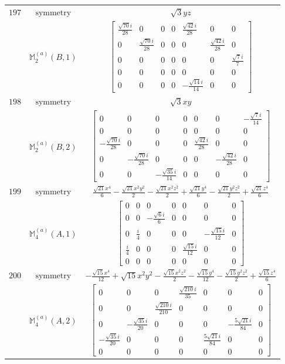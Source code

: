 \documentclass[fleqn,8pt,landscape]{jsarticle}
\begin{document}
\begin{longtable}{ccc}
$ 197 $ & $ \text{symmetry} $ & $ \sqrt{3} y z $ \\
$  $ & $ \mathbb{M}_{2}^{(a)}(B,1) $ & $ \begin{bmatrix} \frac{\sqrt{70} i}{28} & 0 & 0 & 0 & \frac{\sqrt{42} i}{28} & 0 & 0 \\ 0 & \frac{\sqrt{70} i}{28} & 0 & 0 & 0 & \frac{\sqrt{42} i}{28} & 0 \\ 0 & 0 & 0 & 0 & 0 & 0 & \frac{\sqrt{7} i}{7} \\ 0 & 0 & 0 & 0 & 0 & 0 & 0 \\ 0 & 0 & 0 & 0 & - \frac{\sqrt{14} i}{14} & 0 & 0 \end{bmatrix} $ \\ \hline
$ 198 $ & $ \text{symmetry} $ & $ \sqrt{3} x y $ \\
$  $ & $ \mathbb{M}_{2}^{(a)}(B,2) $ & $ \begin{bmatrix} 0 & 0 & 0 & 0 & 0 & 0 & - \frac{\sqrt{7} i}{14} \\ 0 & 0 & 0 & 0 & 0 & 0 & 0 \\ - \frac{\sqrt{70} i}{28} & 0 & 0 & 0 & \frac{\sqrt{42} i}{28} & 0 & 0 \\ 0 & - \frac{\sqrt{70} i}{28} & 0 & 0 & 0 & - \frac{\sqrt{42} i}{28} & 0 \\ 0 & 0 & - \frac{\sqrt{35} i}{14} & 0 & 0 & 0 & 0 \end{bmatrix} $ \\ \hline
$ 199 $ & $ \text{symmetry} $ & $ \frac{\sqrt{21} x^{4}}{6} - \frac{\sqrt{21} x^{2} y^{2}}{2} - \frac{\sqrt{21} x^{2} z^{2}}{2} + \frac{\sqrt{21} y^{4}}{6} - \frac{\sqrt{21} y^{2} z^{2}}{2} + \frac{\sqrt{21} z^{4}}{6} $ \\
$  $ & $ \mathbb{M}_{4}^{(a)}(A,1) $ & $ \begin{bmatrix} 0 & 0 & 0 & 0 & 0 & 0 & 0 \\ 0 & 0 & - \frac{\sqrt{6} i}{6} & 0 & 0 & 0 & 0 \\ 0 & \frac{i}{4} & 0 & 0 & 0 & - \frac{\sqrt{15} i}{12} & 0 \\ \frac{i}{4} & 0 & 0 & 0 & \frac{\sqrt{15} i}{12} & 0 & 0 \\ 0 & 0 & 0 & 0 & 0 & 0 & 0 \end{bmatrix} $ \\ \hline
$ 200 $ & $ \text{symmetry} $ & $ - \frac{\sqrt{15} x^{4}}{12} + \sqrt{15} x^{2} y^{2} - \frac{\sqrt{15} x^{2} z^{2}}{2} - \frac{\sqrt{15} y^{4}}{12} - \frac{\sqrt{15} y^{2} z^{2}}{2} + \frac{\sqrt{15} z^{4}}{6} $ \\
$  $ & $ \mathbb{M}_{4}^{(a)}(A,2) $ & $ \begin{bmatrix} 0 & 0 & 0 & \frac{\sqrt{210} i}{35} & 0 & 0 & 0 \\ 0 & 0 & \frac{\sqrt{210} i}{210} & 0 & 0 & 0 & 0 \\ 0 & - \frac{\sqrt{35} i}{20} & 0 & 0 & 0 & - \frac{5 \sqrt{21} i}{84} & 0 \\ - \frac{\sqrt{35} i}{20} & 0 & 0 & 0 & \frac{5 \sqrt{21} i}{84} & 0 & 0 \\ 0 & 0 & 0 & 0 & 0 & 0 & 0 \end{bmatrix} $ \\ \hline

\end{longtable}
\end{document}
